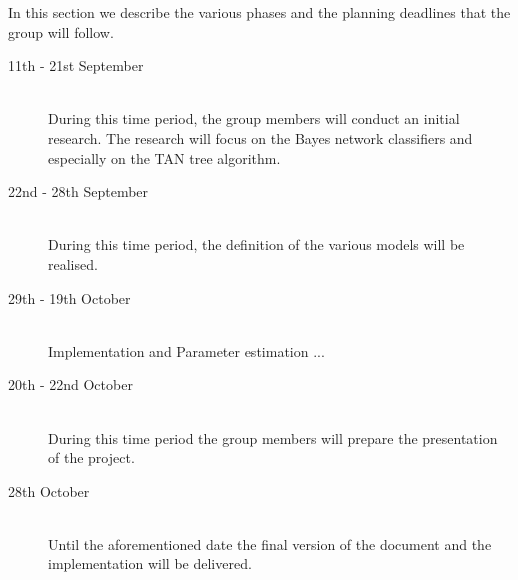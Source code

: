 \documentclass[a4paper, 11pt]{scrartcl}
\begin{document}
In this section we describe the various phases and the planning deadlines that the group will follow.

\begin{description}
	\item[11th - 21st September]\-\\
	During this time period, the group members will conduct an initial research. The research will focus on the Bayes network classifiers and especially on the TAN tree algorithm.
	\item[22nd - 28th September]\-\\
	During this time period, the definition of the various models will be realised.
	\item[29th - 19th October]\-\\
	Implementation and Parameter estimation ...
	\item[20th - 22nd October]\-\\
	During this time period the group members will prepare the presentation of the project.
	\item[28th October]\-\\
	Until the aforementioned date the final version of the document and the implementation will be delivered.
\end{description}


\nocite{*} %


\end{document}
